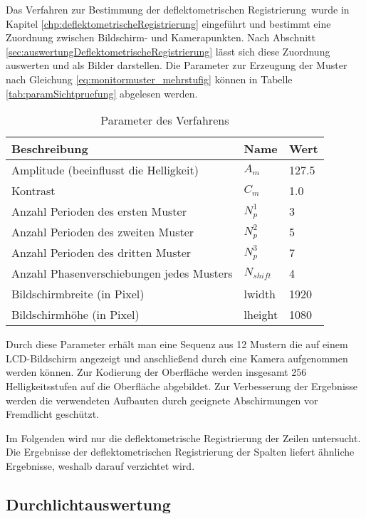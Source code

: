 Das Verfahren zur Bestimmung der \glqq deflektometrischen Registrierung\grqq ~wurde in Kapitel \ref{chp:deflektometrischeRegistrierung} eingeführt und bestimmt eine Zuordnung zwischen Bildschirm- und Kamerapunkten.
Nach Abschnitt \ref{sec:auswertungDeflektometrischeRegistrierung} lässt sich diese Zuordnung auswerten und als Bilder darstellen.
Die Parameter zur Erzeugung der Muster nach Gleichung \ref{eq:monitormuster_mehrstufig} können in Tabelle \ref{tab:paramSichtpruefung} abgelesen werden.

\begin{table}[H]
	\centering
	\begin{tabular}{lll}
	\hline 
	\textbf{Beschreibung} & \textbf{Name} & \textbf{Wert} \\ 
	\hline 
	Amplitude (beeinflusst die Helligkeit) & $A_m$ & 127.5 \\
	Kontrast & $C_m$ & 1.0 \\
	Anzahl Perioden des ersten Muster & $N_p^1$ & 3 \\ 
	Anzahl Perioden des zweiten Muster & $N_p^2$ & 5 \\ 
	Anzahl Perioden des dritten Muster & $N_p^3$ & 7 \\  
	Anzahl Phasenverschiebungen jedes Musters & $N_{shift}$ & 4 \\ 
	Bildschirmbreite (in Pixel) & \acrshort{lwidth} & 1920 \\
	Bildschirmhöhe (in Pixel) & \acrshort{lheight} & 1080 \\
	\hline 
	\end{tabular} 
	\caption{Parameter des Verfahrens}
	\label{tab:paramDeflektometrischRegistrierung}
\end{table}

\noindent
Durch diese Parameter erhält man eine Sequenz aus 12 Mustern die auf einem LCD-Bildschirm angezeigt und anschließend durch eine Kamera aufgenommen werden können.
Zur Kodierung der Oberfläche werden insgesamt 256 Helligkeitsstufen auf die Oberfläche abgebildet.
Zur Verbesserung der Ergebnisse werden die verwendeten Aufbauten durch geeignete Abschirmungen vor Fremdlicht geschützt.

\p
Im Folgenden wird nur die deflektometrische Registrierung der Zeilen untersucht.
Die Ergebnisse der deflektometrischen Registrierung der Spalten liefert ähnliche Ergebnisse, weshalb darauf verzichtet wird.

{
	\FloatBarrier
    \subsection{Durchlichtauswertung}
    \label{sub:durchlichtAuswertungDeflektometrischeRegistrierung}
    
}

